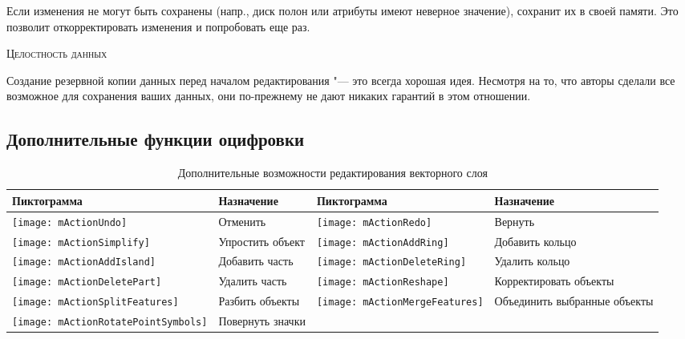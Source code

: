 Если изменения не могут быть сохранены (напр., диск полон или атрибуты
имеют неверное значение), \qg сохранит их в своей памяти. Это позволит
откорректировать изменения и попробовать еще раз.

\begin{Tip}\caption{\textsc{Целостность данных}}
Создание резервной копии данных перед началом редактирования "--- это
всегда хорошая идея. Несмотря на то, что авторы \qg сделали все возможное
для сохранения ваших данных, они по-прежнему не дают никаких гарантий в
этом отношении.
\end{Tip}

\subsection{Дополнительные функции оцифровки}
\label{sec:advanced_edit}

\begin{table}[h]
\centering
\small
\begin{tabular}{|l|p{6.9cm}|l|p{6.9cm}|}
\hline \textbf{Пиктограмма} & \textbf{Назначение} & \textbf{Пиктограмма} & \textbf{Назначение} \\
\hline \texttt{[image: mActionUndo]}
   & Отменить
   & \texttt{[image: mActionRedo]}
   & Вернуть \\
\hline \texttt{[image: mActionSimplify]}
   & Упростить объект
   & \texttt{[image: mActionAddRing]}
   & Добавить кольцо \\
\hline \texttt{[image: mActionAddIsland]}
   & Добавить часть
   & \texttt{[image: mActionDeleteRing]}
   & Удалить кольцо \\
\hline \texttt{[image: mActionDeletePart]}
   & Удалить часть
   & \texttt{[image: mActionReshape]}
   & Корректировать объекты \\
\hline \texttt{[image: mActionSplitFeatures]}
   & Разбить объекты
   & \texttt{[image: mActionMergeFeatures]}
   & Объединить выбранные объекты \\
\hline \texttt{[image: mActionRotatePointSymbols]}
   & Повернуть значки
   &
   & \\
\hline
\end{tabular}
\caption{Дополнительные возможности редактирования векторного слоя}\label{tab:advanced_editing}
\end{table}

